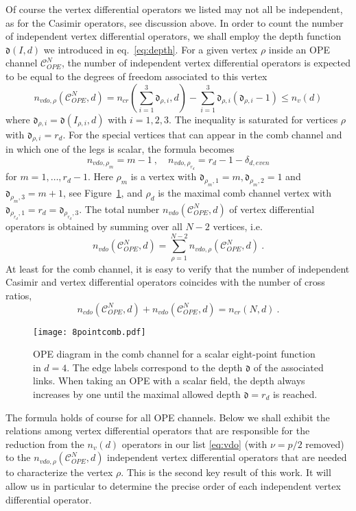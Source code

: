 \documentclass{article}
\def\dep{\mathfrak{d}}
\begin{document}
Of course the vertex differential operators we listed may not all be independent, 
as for the Casimir operators, see discussion above. In order to 
count the number of independent vertex differential operators, we shall employ the 
depth function $\dep(I,d)$ we introduced in eq.\ \eqref{eq:depth}. For a given 
vertex $\rho$ inside an OPE channel $\mathcal{C}^N_\textit{OPE}$, the number of independent vertex differential operators is expected to be equal to the degrees of freedom associated to this vertex
\begin{equation} \label{eq:novertrest} 
n_{\textit{vdo},\rho}(\mathcal{C}^N_\textit{OPE},d) = 
n_\textit{cr}(\sum_{i=1}^3 \dep_{\rho,i},d) - 
\sum_{i=1}^3 \dep_{\rho,i} (\dep_{\rho,i}-1)  \leq n_v(d)
\end{equation}
where $\dep_{\rho,i} = \dep(I_{\rho,i},d)$ with $i =1,2,3$. The 
inequality is saturated for vertices $\rho$ with $\dep_{\rho,i} = r_d$. For 
the special vertices that can appear in the comb channel and in which one of the 
legs is scalar, the formula becomes 
$$ n_{\textit{vdo},\rho_m} = m-1 \  , \quad n_{\textit{vdo},\rho_{r_d}} = 
r_d - 1 - \delta_{d,\textit{even}}
$$ 
for $m = 1, \dots, r_d-1$. Here $\rho_m$ is a vertex with $\dep_{\rho_m,1} = m, 
\dep_{\rho_m, 2} = 1$ and $\dep_{\rho_m,3} = m+1$, see Figure~\ref{fig:8pointcomb}, and $\rho_d$
is the maximal comb channel vertex with $\dep_{\rho_{r_d},1} = r_d = 
\dep_{\rho_{r_d},3}$. The total number $n_\textit{vdo}(\mathcal{C}^N_\textit{OPE},d)$ 
of vertex differential operators is obtained by summing over all $N-2$ vertices, i.e. 
$$n_\textit{vdo}(\mathcal{C}^N_\textit{OPE},d) = \sum_{\rho = 1}^{N-2} 
n_{\textit{vdo},\rho}(\mathcal{C}^N_\textit{OPE},d)\ . $$ 
At least for the comb channel, it is easy to verify that the number of independent 
Casimir and vertex differential operators coincides with the number of cross ratios, 
$$  n_{\textit{cdo}}(\mathcal{C}^N_\textit{OPE},d) +
n_\textit{vdo}(\mathcal{C}^N_\textit{OPE},d) = n_\textit{cr}(N,d) \ . $$
\begin{figure}[thb]
\centering
\texttt{[image: 8pointcomb.pdf]}
\caption{OPE diagram in the comb channel for a scalar eight-point function in $d=4$. The edge labels correspond to the depth $\dep$ of the associated links. When taking an OPE with a scalar field, the depth always increases by one until the maximal allowed depth $\dep=r_d$ is reached.}
\label{fig:8pointcomb}
\end{figure}
The formula holds of course for all OPE channels. Below we shall exhibit the 
relations among vertex differential operators that are responsible for the 
reduction from the $n_v(d)$ operators in our list \eqref{eq:vdo} (with $\nu = 
p/2$ removed) to the $n_{\textit{vdo},\rho} (\mathcal{C}^N_\textit{OPE},d)$ 
independent vertex differential operators that are needed to characterize 
the vertex $\rho$. This is the second key result of this work. It will allow 
us in particular to determine the precise order of each independent 
vertex differential operator. 
\end{document}

